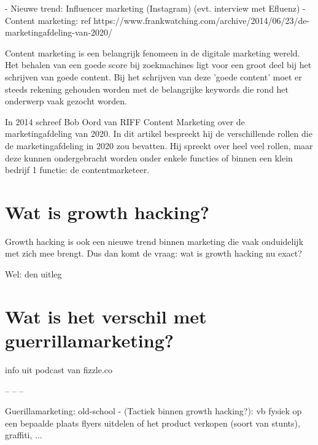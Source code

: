 - Nieuwe trend: Influencer marketing (Instagram) (evt. interview met Efluenz)
- Content marketing: ref https://www.frankwatching.com/archive/2014/06/23/de-marketingafdeling-van-2020/

Content marketing is een belangrijk fenomeen in de digitale marketing wereld. Het behalen van een goede score bij zoekmachines ligt voor een groot deel bij het schrijven van goede content. Bij het schrijven van deze 'goede content' moet er steeds rekening gehouden worden met de belangrijke keywords die rond het onderwerp vaak gezocht worden. 

In 2014 schreef Bob Oord van RIFF Content Marketing over de marketingafdeling van 2020. In dit artikel bespreekt hij de verschillende rollen die de marketingafdeling in 2020 zou bevatten. Hij spreekt over heel veel rollen, maar deze kunnen ondergebracht worden onder enkele functies of binnen een klein bedrijf 1 functie: de contentmarketeer. 

\section{Wat is growth hacking?}
\label{sec:wat-is-growth-hacking}
Growth hacking is ook een nieuwe trend binnen marketing die vaak onduidelijk met zich mee brengt. Dus dan komt de vraag: wat is growth hacking nu exact?

Wel: den uitleg

\section{Wat is het verschil met guerrillamarketing?}
\label{sec:verschil-met-guerrillamarketing}

info uit podcast van fizzle.co

 -- -- -- 

Guerillamarketing: old-school
- (Tactiek binnen growth hacking?): vb fysiek op een bepaalde plaats flyers uitdelen of het product verkopen (soort van stunts), graffiti, ...

